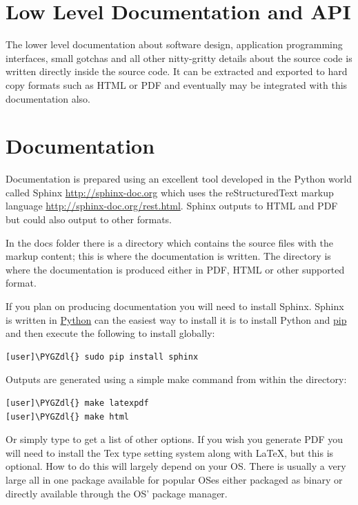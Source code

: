 \documentclass[letterpaper,10pt,english]{sphinxmanual}
\def\PYGZdl{\char`\$}
\begin{document}
\section{Low Level Documentation and API}
\label{developer-guide:low-level-documentation-and-api}
The lower level documentation about software design, application
programming interfaces, small gotchas and all other nitty-gritty
details about the source code is written directly inside the source
code. It can be extracted and exported to hard copy formats such as
HTML or PDF and eventually may be integrated with this documentation
also.


\section{Documentation}
\label{developer-guide:documentation}
Documentation is prepared using an excellent tool developed in the
Python world called Sphinx \href{http://sphinx-doc.org}{http://sphinx-doc.org} which uses the reStructuredText markup
language \href{http://sphinx-doc.org/rest.html}{http://sphinx-doc.org/rest.html}. Sphinx outputs to HTML and PDF
but could also output to other formats.

In the docs folder there is a  directory which contains the
source files with the markup content; this is where the documentation
is written. The  directory is where the documentation is
produced either in PDF, HTML or other supported format.

If you plan on producing documentation you will need to install
Sphinx. Sphinx is written in \href{https://www.python.org/}{Python} can
the easiest way to install it is to install Python and \href{https://github.com/pypa/pip}{pip} and then execute the following to
install globally:

\begin{Verbatim}[commandchars=\\\{\}]
[user]\PYGZdl{} sudo pip install sphinx
\end{Verbatim}

Outputs are generated using a simple make command from within the
 directory:

\begin{Verbatim}[commandchars=\\\{\}]
[user]\PYGZdl{} make latexpdf
[user]\PYGZdl{} make html
\end{Verbatim}

Or simply type  to get a list of other options. If you wish
you generate PDF you will need to install the Tex type setting system
along with LaTeX, but this is optional. How to do this will largely
depend on your OS. There is usually a very large all in one package
available for popular OSes either packaged as binary or directly
available through the OS' package manager.
\end{document}

